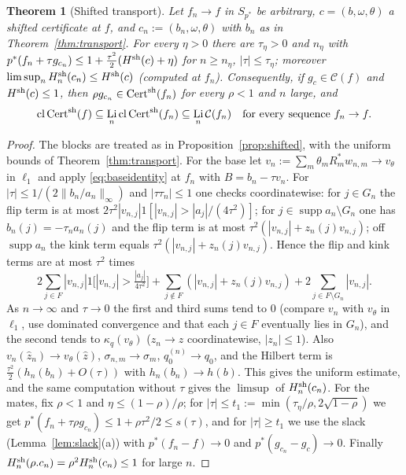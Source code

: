 \documentclass[10pt]{amsart}
\newtheorem{theorem}{Theorem}[section]
\theoremstyle{definition}
\theoremstyle{remark}
\newcommand{\supp}{\operatorname{supp}}
\newcommand{\Cset}{\mathcal C}
\newcommand{\Cert}{\operatorname{Cert}}
\newcommand{\Li}{\operatorname*{Li}}
\newcommand{\cl}{\operatorname{cl}}
\newcommand{\zh}{\hat z}
\begin{document}
\begin{theorem}[Shifted transport]\label{thm:shifted}
Let $f_n\to f$ in $S_{p^*}$ be arbitrary, $c=(b,\omega,\theta)$ a shifted
certificate at $f$, and $c_n:=(b_n,\omega,\theta)$ with $b_n$ as in
Theorem~\ref{thm:transport}.  For every $\eta>0$ there are $\tau_\eta>0$ and
$n_\eta$ with $p^*(f_n+\tau g_{c_n})\le1+\frac{\tau^2}2(H^{\rm sh}(c)+\eta)$
for $n\ge n_\eta$, $|\tau|\le\tau_\eta$; moreover $\limsup_nH^{\rm
sh}_n(c_n)\le H^{\rm sh}(c)$ \textup{(}computed at $f_n$\textup{)}.
Consequently, if $g_c\in\Cset(f)$ and $H^{\rm sh}(c)\le1$, then
$\rho g_{c_n}\in\Cert^{\rm sh}(f_n)$ for every $\rho<1$ and $n$ large, and
\[
 \cl\Cert^{\rm sh}(f)\subseteq\Li_n\cl\Cert^{\rm sh}(f_n)\subseteq
 \Li_n\Cset(f_n)\quad\text{for every sequence }f_n\to f.
\]
\end{theorem}

\begin{proof}
The blocks are treated as in Proposition~\ref{prop:shifted}, with the
uniform bounds of Theorem~\ref{thm:transport}.  For the base let
$v_n:=\sum_m\theta_mR_m^*w_{n,m}\to v_\theta$ in $\ell_1$ and apply
\eqref{eq:baseidentity} at $f_n$ with $B=b_n-\tau v_n$.  For
$|\tau|\le1/(2\|b_n/a_n\|_\infty)$ and $|\tau\tau_n|\le1$ one checks
coordinatewise: for $j\in G_n$ the flip term is at most
$2\tau^2|v_{n,j}|1[|v_{n,j}|>|a_j|/(4\tau^2)]$; for $j\in\supp a_n\setminus
G_n$ one has $b_n(j)=-\tau_na_n(j)$ and the flip term is at most
$\tau^2(|v_{n,j}|+z_n(j)v_{n,j})$; off $\supp a_n$ the kink term equals
$\tau^2(|v_{n,j}|+z_n(j)v_{n,j})$.  Hence the flip and kink terms are at
most $\tau^2$ times
\[
 2\sum_{j\in F}|v_{n,j}|1\big[|v_{n,j}|>\tfrac{|a_j|}{4\tau^2}\big]
 +\sum_{j\notin F}(|v_{n,j}|+z_n(j)v_{n,j})+2\sum_{j\in F\setminus
 G_n}|v_{n,j}|.
\]
As $n\to\infty$ and $\tau\to0$ the first and third sums tend to $0$
(compare $v_n$ with $v_\theta$ in $\ell_1$, use dominated convergence and
that each $j\in F$ eventually lies in $G_n$), and the second tends to
$\kappa_q(v_\theta)$ ($z_n\to z$ coordinatewise, $|z_n|\le1$).  Also
$v_n(\zh_n)\to v_\theta(\zh)$, $\sigma_{n,m}\to\sigma_m$,
$q_0^{(n)}\to q_0$, and the Hilbert term is
$\frac{\tau^2}2(h_n(b_n)+O(\tau))$ with $h_n(b_n)\to h(b)$.  This gives the
uniform estimate, and the same computation without $\tau$ gives the
$\limsup$ of $H^{\rm sh}_n(c_n)$.  For the mates, fix $\rho<1$ and
$\eta\le(1-\rho)/\rho$; for $|\tau|\le t_1:=\min(\tau_\eta/\rho,
2\sqrt{1-\rho})$ we get $p^*(f_n+\tau\rho g_{c_n})\le1+\rho\tau^2/2\le
s(\tau)$, and for $|\tau|\ge t_1$ we use the slack
(Lemma~\ref{lem:slack}(a)) with $p^*(f_n-f)\to0$ and
$p^*(g_{c_n}-g_c)\to0$.  Finally $H^{\rm sh}_n(\rho.c_n)=\rho^2H^{\rm
sh}_n(c_n)\le1$ for large $n$.
\end{proof}
\end{document}
